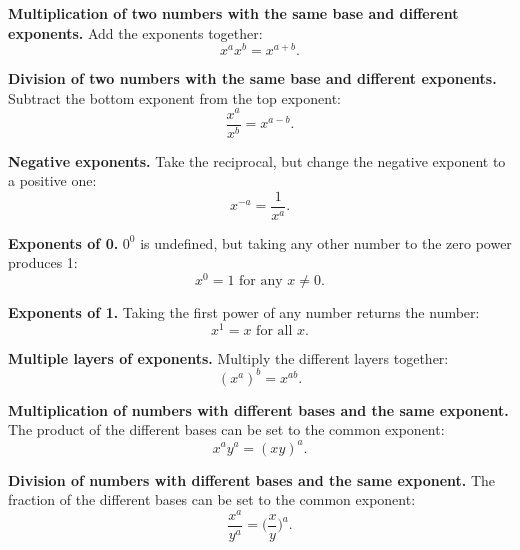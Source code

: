

\begin{enumerate*}
\item \textbf{Multiplication of two numbers with the same base and different exponents.} Add the exponents together:\vspace*{-3pt}
\begin{equation*}
x^a x^b=x^{a+b}.
\end{equation*}
\item \textbf{Division of two numbers with the same base and different exponents.} Subtract the bottom exponent from the top exponent:
\begin{equation*}
\frac{x^a}{x^b}=x^{a-b}.
\end{equation*}
\item \textbf{Negative exponents.}  Take the reciprocal, but change the negative exponent to a positive one:\vspace*{-3pt}
\begin{equation*}
x^{-a}=\frac{1}{x^a}.
\end{equation*}
\item \textbf{Exponents of 0.}  $0^0$ is undefined, but taking any other number to the zero power produces 1:\vspace*{-3pt}
\begin{equation*}
x^0=1 \text{   for any   }x\neq 0.
\end{equation*}
\item \textbf{Exponents of 1.}  Taking the first power of any number returns the number:
\begin{equation*}
x^1=x\text{   for all   }x.
\end{equation*}
\item \textbf{Multiple layers of exponents.}  Multiply the different layers together:
\begin{equation*}
(x^a)^b=x^{ab}.
\end{equation*}
\item \textbf{Multiplication of numbers with different bases and the same exponent.}  The product of the different bases can be set to the common exponent:
\begin{equation*}
x^ay^a=(xy)^a.
\end{equation*}
\item \textbf{Division of numbers with different bases and the same exponent.} The fraction of the different bases can be set to the common exponent:
\begin{equation*}
\frac{x^a}{y^a}=\bigg(\frac{x}{y}\bigg)^a.
\end{equation*}
\end{enumerate*}

